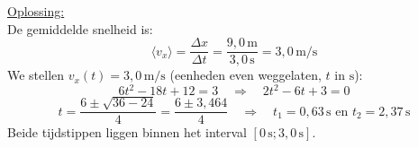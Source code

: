 \documentclass{ximera}
\begin{document}
\begin{exercise}
\begin{question}
\begin{solution}
            \underline{Oplossing:}\\
            De gemiddelde snelheid is:
            \[
                \langle v_x \rangle = \frac{\Delta x}{\Delta t} = \frac{9{,}0 \, \mathrm{m}}{3{,}0 \, \mathrm{s}} = 3{,}0 \, \mathrm{m/s}
            \]
            We stellen $v_x(t) = 3{,}0 \, \mathrm{m/s}$ (eenheden even weggelaten, $t$ in $\mathrm{s}$):
            \[
                6t^{2} - 18t + 12 = 3 \quad \Rightarrow \quad 2t^{2} - 6t + 3 = 0
            \]
            \[
                t = \frac{6 \pm \sqrt{36 - 24}}{4} = \frac{6 \pm 3{,}464}{4} \quad \Rightarrow \quad \boxed{t_1 = 0{,}63 \, \mathrm{s} \text{ en } t_2 = 2{,}37 \, \mathrm{s}}
            \]
            Beide tijdstippen liggen binnen het interval $[0 \, \mathrm{s}; 3{,}0 \, \mathrm{s}]$.
        \end{solution}
    \end{question}
\end{exercise}
\end{document}
